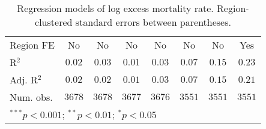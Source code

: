 \begin{table}
\begin{center}
\begin{tabular}{l c c c c c c c}
\hline
Region FE      & No           & No           & No           & No           & No            & No            & Yes           \\
R$^2$          & $0.02$       & $0.03$       & $0.01$       & $0.03$       & $0.07$        & $0.15$        & $0.23$        \\
Adj. R$^2$     & $0.02$       & $0.02$       & $0.01$       & $0.03$       & $0.07$        & $0.15$        & $0.21$        \\
Num. obs.      & $3678$       & $3678$       & $3677$       & $3676$       & $3551$        & $3551$        & $3551$        \\
\hline
\multicolumn{8}{l}{\scriptsize{$^{***}p<0.001$; $^{**}p<0.01$; $^{*}p<0.05$}}
\end{tabular}
\caption{Regression models of log excess mortality rate. Region-clustered standard errors between parentheses.}
\label{tab:basemodels}
\end{center}
\end{table}
